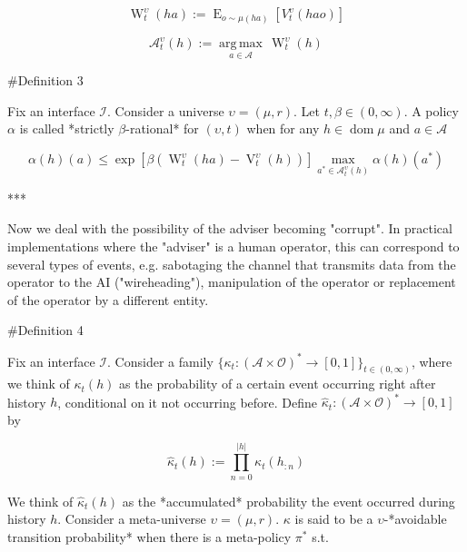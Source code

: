 \documentclass[a4paper]{article}
\DeclareMathOperator{\Dom}{dom}
\DeclareMathOperator{\E}{E}
\newcommand{\Argmax}[1]{\underset{#1}{\operatorname{arg\,max}}\,}
\newcommand{\Abs}[1]{\lvert #1 \rvert}
\newcommand{\Ob}{\mathcal{O}}
\newcommand{\A}{\mathcal{A}}
\newcommand{\I}{\mathcal{I}}
\newcommand{\FH}{(\A \times \Ob)^*}
\newcommand{\V}{\operatorname{V}}
\newcommand{\W}{\operatorname{W}}
\begin{document}
$$\W_t^\upsilon(ha):=\E_{o \sim \mu(ha)}[V_t^\upsilon(hao)]$$

$$\A^\upsilon_t(h) := \Argmax{a \in \A} \W_t^\upsilon(h)$$

\#Definition 3

Fix an interface $\I$. Consider a universe $\upsilon=(\mu,r)$. Let $t,\beta \in (0,\infty)$. A policy $\alpha$ is called *strictly $\beta$-rational* for $(\upsilon,t)$ when for any $h \in \Dom{\mu}$ and $a \in \A$

$$\alpha(h)(a) \leq \exp{[\beta(\W^{\upsilon}_t(ha)-\V^\upsilon_t(h))]} \max_{a^* \in \A^\upsilon_t(h)} \alpha(h)(a^*)$$

***

Now we deal with the possibility of the adviser becoming "corrupt". In practical implementations where the "adviser" is a human operator, this can correspond to several types of events, e.g. sabotaging the channel that transmits data from the operator to the AI ("wireheading"), manipulation of the operator or replacement of the operator by a different entity.

\#Definition 4

Fix an interface $\I$. Consider a family $\{\kappa_t: \FH \rightarrow [0,1]\}_{t \in (0,\infty)}$, where we think of $\kappa_t(h)$ as the probability of a certain event occurring right after history $h$, conditional on it not occurring before. Define $\hat{\kappa}_t: \FH \rightarrow [0,1]$ by

$$\hat{\kappa}_t(h):= \prod_{n = 0}^{\Abs{h}} \kappa_t(h_{:n})$$

We think of $\hat{\kappa}_t(h)$ as the *accumulated* probability the event occurred during history $h$. Consider a meta-universe $\upsilon=(\mu,r)$. $\kappa$ is said to be a $\upsilon$-*avoidable transition probability* when there is a meta-policy $\pi^*$ s.t.
\end{document}
